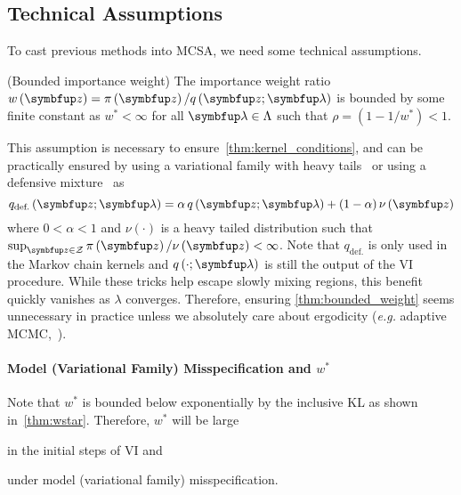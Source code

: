 \vspace{-0.1in}
\subsection{Technical Assumptions}\label{section:assumption}
\vspace{-0.07in}
To cast previous methods into MCSA, we need some technical assumptions.

\begin{assumption}{(Bounded importance weight)}\label{thm:bounded_weight}
  The importance weight ratio \(w\left(\vz\right) = \pi\left(\vz\right) / q\left(\vz; \vlambda\right)\) is bounded by some finite constant as \(w^* < \infty\) for all \(\vlambda \in \Lambda\) such that \(\rho = \left(1 - 1/w^*\right) < 1\).
\end{assumption}
\vspace{-0.05in}
This assumption is necessary to ensure~\cref{thm:kernel_conditions}, and can be practically ensured by using a variational family with heavy tails~\citep{NEURIPS2018_25db67c5} or using a defensive mixture~\citep{hesterberg_weighted_1995, holden_adaptive_2009} as
\vspace{-0.07in}
{\[
  q_{\text{def.}}\left(\vz; \vlambda \right) = \alpha \, q\left(\vz; \vlambda\right) + (1 - \alpha) \, \nu\left(\vz\right)
\]%
\vspace{-0.01in}}%
where \(0 < \alpha < 1\) and \(\nu\left(\cdot\right)\) is a heavy tailed distribution such that \(\sup_{\vz \in \mathcal{Z}} \pi\left(\vz\right) / \nu\left(\vz\right) < \infty\).
Note that \(q_{\text{def.}}\) is only used in the Markov chain kernels and \(q\left(\cdot;\vlambda\right)\) is still the output of the VI procedure.
While these tricks help escape slowly mixing regions, this benefit quickly vanishes as \(\lambda\) converges.
Therefore, ensuring \cref{thm:bounded_weight} seems unnecessary in practice unless we absolutely care about ergodicity (\textit{e.g.} adaptive MCMC,~\citealt{holden_adaptive_2009, pmlr-v151-brofos22a}).

\vspace{-0.1in}
\paragraph{\textbf{Model (Variational Family) Misspecification and \(w^*\)}}
Note that \(w^*\) is bounded below exponentially by the inclusive KL as shown in~\cref{thm:wstar}.
Therefore, \(w^*\) will be large 
\begin{enumerate*}[label=\textbf{(\roman*)}]
    \item in the initial steps of VI and
    \item under model (variational family) misspecification.
\end{enumerate*}

